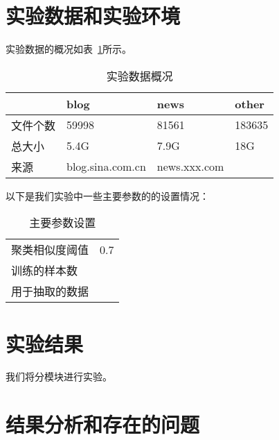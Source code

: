 \section{实验数据和实验环境}
\label{sec:dataenv}
实验数据的概况如表~\ref{experiment:tab:overview}所示。
\begin{table}
  \centering
\begin{tabular}{llll}
\hline
 & blog & news & other \\
\hline
文件个数 & 59998 & 81561 & 183635 \\
总大小 & 5.4G & 7.9G & 18G \\
来源 & blog.sina.com.cn &  news.xxx.com &  \\
\hline
\end{tabular}
  \caption{实验数据概况}
  \label{experiment:tab:overview}
\end{table}
\begin{comment}
#+ORGTBL: SEND 实验数据概况 orgtbl-to-latex :splice nil :skip 0
|----------+------------------+-------+--------|
|          | blog             | news  | other  |
|----------+------------------+-------+--------|
| 文件个数 | 59998            | 81561 | 183635 |
| 总大小   | 5.4G             | 7.9G  | 18G    |
| 来源     | blog.sina.com.cn |       |        |
|----------+------------------+-------+--------|
\end{comment}

以下是我们实验中一些主要参数的的设置情况：
\begin{table}\centering
\begin{tabular}{ll}
聚类相似度阈值 & 0.7\\
训练的样本数 &  \\
用于抽取的数据 &  \\
\end{tabular}
\caption{主要参数设置}
\label{experiment:tab:param}
\end{table}
\begin{comment}
#+ORGTBL: SEND 参数设置 orgtbl-to-latex :splice nil :skip 0
| 聚类相似度阈值 |   |
| 训练的样本数   |   |
| 用于抽取的数据 |   |
\end{comment}
\section{实验结果}
\label{sec:results}
我们将分模块进行实验。
\section{结果分析和存在的问题}
\label{sec:analysis}


